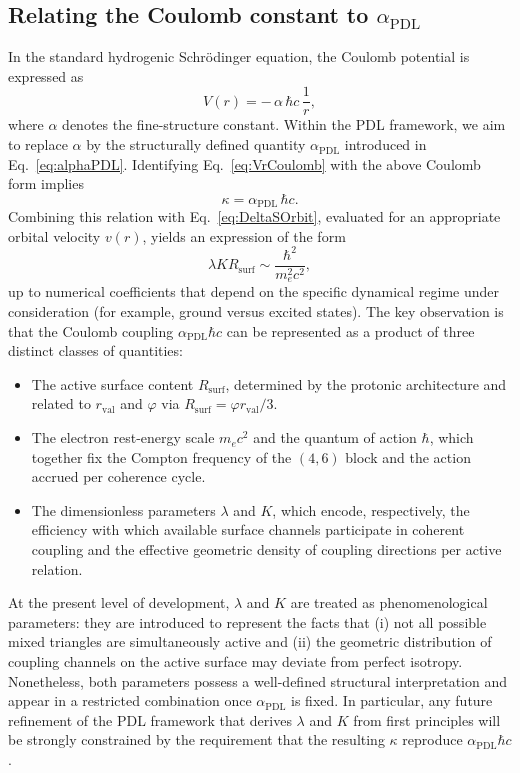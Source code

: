 \documentclass[11pt,a4paper]{article}
\begin{document}
\subsection{Relating the Coulomb constant to \texorpdfstring{$\alpha_{\mathrm{PDL}}$}{alpha	extsubscript{PDL}}}

In the standard hydrogenic Schr\"odinger equation, the Coulomb potential is expressed as
\begin{equation}
V(r) = -\,\alpha\,\hbar c\,\frac{1}{r},
\end{equation}
where $\alpha$ denotes the fine-structure constant. Within the PDL framework, we aim to replace $\alpha$ by the structurally defined quantity $\alpha_{\mathrm{PDL}}$ introduced in Eq.~\eqref{eq:alphaPDL}. Identifying Eq.~\eqref{eq:VrCoulomb} with the above Coulomb form implies
\begin{equation}
\kappa = \alpha_{\mathrm{PDL}}\,\hbar c.
\end{equation}
Combining this relation with Eq.~\eqref{eq:DeltaSOrbit}, evaluated for an appropriate orbital velocity $v(r)$, yields an expression of the form
\begin{equation}
\lambda K R_{\mathrm{surf}} \sim \frac{\hbar^{2}}{m_e^{2} c^{2}},
\end{equation}
up to numerical coefficients that depend on the specific dynamical regime under consideration (for example, ground versus excited states). The key observation is that the Coulomb coupling $\alpha_{\mathrm{PDL}}\hbar c$ can be represented as a product of three distinct classes of quantities:
\begin{itemize}
\item The active surface content $R_{\mathrm{surf}}$, determined by the protonic architecture and related to $r_{\mathrm{val}}$ and $\varphi$ via $R_{\mathrm{surf}} = \varphi r_{\mathrm{val}}/3$.
\item The electron rest-energy scale $m_e c^{2}$ and the quantum of action $\hbar$, which together fix the Compton frequency of the $(4,6)$ block and the action accrued per coherence cycle.
\item The dimensionless parameters $\lambda$ and $K$, which encode, respectively, the efficiency with which available surface channels participate in coherent coupling and the effective geometric density of coupling directions per active relation.
\end{itemize}

At the present level of development, $\lambda$ and $K$ are treated as phenomenological parameters: they are introduced to represent the facts that (i) not all possible mixed triangles are simultaneously active and (ii) the geometric distribution of coupling channels on the active surface may deviate from perfect isotropy. Nonetheless, both parameters possess a well-defined structural interpretation and appear in a restricted combination once $\alpha_{\mathrm{PDL}}$ is fixed. In particular, any future refinement of the PDL framework that derives $\lambda$ and $K$ from first principles will be strongly constrained by the requirement that the resulting $\kappa$ reproduce $\alpha_{\mathrm{PDL}}\hbar c$.
\end{document}
